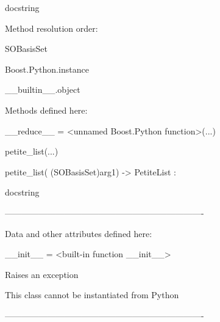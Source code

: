 \documentclass[letterpaper,10pt,english]{sphinxmanual}
\begin{document}
\begin{description}
\begin{description}
\item[{class SOBasisSet(Boost.Python.instance)}] \leavevmode
\begin{DUlineblock}{0em}
\item[] docstring
\item[] 
\item[] Method resolution order:
\item[]
\begin{DUlineblock}{\DUlineblockindent}
\item[] SOBasisSet
\item[] Boost.Python.instance
\item[] \_\_builtin\_\_.object
\item[] 
\end{DUlineblock}
\item[] Methods defined here:
\item[] 
\item[] \_\_reduce\_\_ = \textless{}unnamed Boost.Python function\textgreater{}(...)
\item[] 
\item[] petite\_list(...)
\item[]
\begin{DUlineblock}{\DUlineblockindent}
\item[] petite\_list( (SOBasisSet)arg1) -\textgreater{} PetiteList :
\item[]
\begin{DUlineblock}{\DUlineblockindent}
\item[] docstring
\item[] 
\end{DUlineblock}
\end{DUlineblock}
\item[] ----------------------------------------------------------------------
\item[] Data and other attributes defined here:
\item[] 
\item[] \_\_init\_\_ = \textless{}built-in function \_\_init\_\_\textgreater{}
\item[]
\begin{DUlineblock}{\DUlineblockindent}
\item[] Raises an exception
\item[] This class cannot be instantiated from Python
\item[] 
\end{DUlineblock}
\item[] ----------------------------------------------------------------------

\end{DUlineblock}
\end{description}
\end{description}
\end{document}
